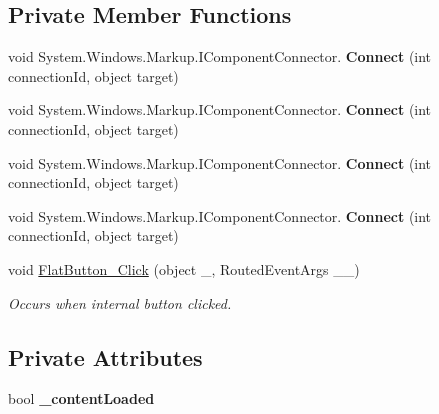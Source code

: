 \subsection*{Private Member Functions}
\begin{DoxyCompactItemize}
\item 
\mbox{\label{class_wpf_handler_1_1_u_i_1_1_controls_1_1_flat_button_a8dbfddaea8859d6d10ddc916cd6ce094}} 
void System.\+Windows.\+Markup.\+I\+Component\+Connector. {\bfseries Connect} (int connection\+Id, object target)
\item 
\mbox{\label{class_wpf_handler_1_1_u_i_1_1_controls_1_1_flat_button_a8dbfddaea8859d6d10ddc916cd6ce094}} 
void System.\+Windows.\+Markup.\+I\+Component\+Connector. {\bfseries Connect} (int connection\+Id, object target)
\item 
\mbox{\label{class_wpf_handler_1_1_u_i_1_1_controls_1_1_flat_button_a8dbfddaea8859d6d10ddc916cd6ce094}} 
void System.\+Windows.\+Markup.\+I\+Component\+Connector. {\bfseries Connect} (int connection\+Id, object target)
\item 
\mbox{\label{class_wpf_handler_1_1_u_i_1_1_controls_1_1_flat_button_a8dbfddaea8859d6d10ddc916cd6ce094}} 
void System.\+Windows.\+Markup.\+I\+Component\+Connector. {\bfseries Connect} (int connection\+Id, object target)
\item 
void \mbox{\hyperlink{class_wpf_handler_1_1_u_i_1_1_controls_1_1_flat_button_a5248afc0ce1627f03c235fc2d2df8230}{Flat\+Button\+\_\+\+Click}} (object \+\_\+, Routed\+Event\+Args \+\_\+\+\_\+)
\begin{DoxyCompactList}\small\item\em Occurs when internal button clicked. \end{DoxyCompactList}\end{DoxyCompactItemize}
\subsection*{Private Attributes}
\begin{DoxyCompactItemize}
\item 
\mbox{\label{class_wpf_handler_1_1_u_i_1_1_controls_1_1_flat_button_a894cd257cfad5ffdf7b4208cb022d41d}} 
bool {\bfseries \+\_\+content\+Loaded}
\end{DoxyCompactItemize}


